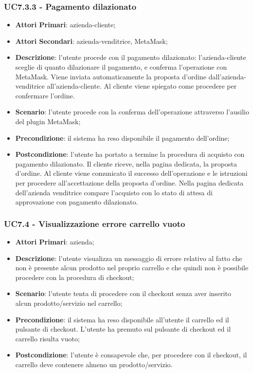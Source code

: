 \subsubsection{UC7.3.3 - Pagamento dilazionato}
\begin{itemize}
	\item \textbf{Attori Primari}: azienda-cliente;
	\item \textbf{Attori Secondari}: azienda-venditrice, MetaMask\glo;
	\item \textbf{Descrizione}: l'utente procede con il pagamento dilazionato: l'azienda-cliente sceglie di quanto dilazionare il pagamento, e conferma l'operazione con MetaMask\glo. Viene inviata automaticamente la proposta d'ordine dall'azienda-venditrice all'azienda-cliente. Al cliente viene spiegato come procedere per confermare l'ordine.
	\item \textbf{Scenario}: l'utente procede con la conferma dell'operazione attraverso l'ausilio del plugin MetaMask\glo;
	\item \textbf{Precondizione}: il sistema ha reso disponibile il pagamento dell'ordine;
	\item \textbf{Postcondizione}: l'utente ha portato a termine la procedura di acquisto con pagamento dilazionato. Il cliente riceve, nella pagina dedicata, la proposta d'ordine. Al cliente viene comunicato il successo dell'operazione e le istruzioni per procedere all'accettazione della proposta d'ordine. Nella pagina dedicata dell'azienda venditrice compare l'acquisto con lo stato di attesa di approvazione con pagamento dilazionato.
\end{itemize}

\subsubsection{UC7.4 - Visualizzazione errore carrello vuoto}
\begin{itemize}
	\item \textbf{Attori Primari}: azienda;
	\item \textbf{Descrizione}:
	l'utente visualizza un messaggio di errore relativo al fatto che non è presente alcun prodotto nel proprio carrello e che quindi non è possibile procedere con la procedura di checkout;
	\item \textbf{Scenario}: l'utente tenta di procedere con il checkout senza aver inserito alcun prodotto/servizio nel carrello;
	\item \textbf{Precondizione}: il sistema ha reso disponibile all'utente il carrello ed il pulsante di checkout. L'utente ha premuto sul pulsante di checkout ed il carrello risulta vuoto; 
	\item \textbf{Postcondizione}:
	l'utente è consapevole che, per procedere con il checkout, il carrello deve contenere almeno un prodotto/servizio. 
\end{itemize}
